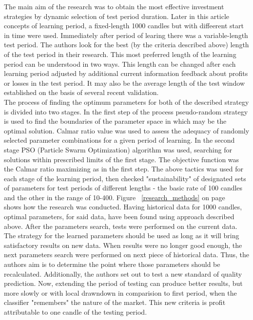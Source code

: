 \documentclass{tewiart}
\begin{document}
The main aim of the research was to obtain the most effective investment strategies by dynamic selection of test period duration. Later in this article concepts of learning period, a fixed-length 1000 candles but with diffeerent start in
time were used.  Immediately after period of learing there was a variable-length test period. The authors look for the best (by the criteria described above) length of the test period in their research. This most preferred length of the learning period can be understood in two ways. This length can be changed after each learning period adjusted by additional current information feedback about profits or losses in the test period. It may also be the average length of the test window established on the basis of several recent validation.\\

The process of finding the optimum parameters for both of the described strategy is divided into two stages. In the first step of the process pseudo-random strategy is used to find the boundaries of the parameter space in which may be the optimal solution. Calmar ratio value was used to assess the adequacy of randomly selected parameter combinations for a given period of learning. In the second stage PSO (Particle Swarm Optimization) \cite{Kennedy}  algorithm was used, searching for solutions within prescribed limits of the first stage. The objective function was the Calmar ratio maximizing as in the first step. The above tactics was used for each stage of the learning period, then checked "sustainability" of designated sets of parameters for test periods of different lengths - the basic rate of 100 candles and the other in the range of 10-400.
Figure ~\ref{research_methods} on page ~\pageref{research_methods} shows how the research was conducted. Having historical data for 1000 candles, optimal parameters, for said data, have been found using approach described above. After the parameters search, tests were performed on the current data. The strategy for the learned parameters should be used as long as it will bring satisfactory results on new data. When results were no longer good enough, the next parameters search were performed on next piece of historical data. Thus, the authors aim is to determine the point where those parameters should be recalculated. Additionally, the authors set out to test a new standard of quality prediction. Now, extending the period of testing can produce better results, but more slowly or with local drawndown in comparision to first period, when the classifier "remembers" the nature of the market. This new criteria is profit attributable to one candle of the testing period.\\
\end{document}
